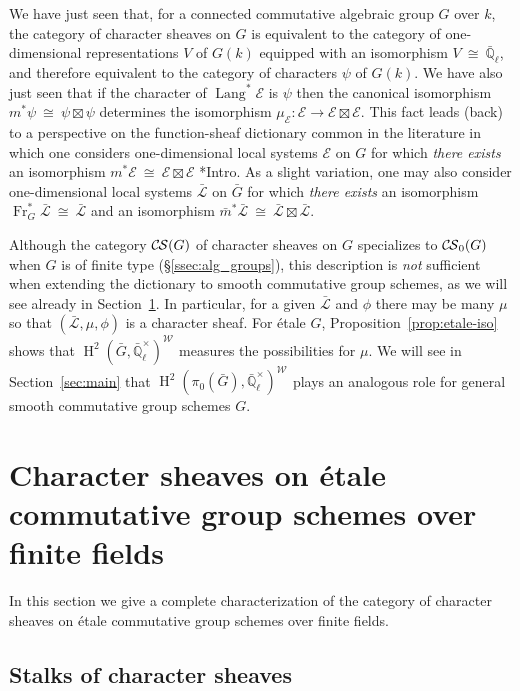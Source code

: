 \documentclass[10pt]{amsart}
\theoremstyle{plain}
\theoremstyle{definition}
\newcommand{\EE}{\mathbb{\bar Q}_\ell}
\newcommand{\Fq}{k}
\newcommand{\EEx}{\EE^\times}
\newcommand{\Weil}[1]{\mathcal{W}_{#1}}
\newcommand{\Frob}[1]{\operatorname{Fr}_{#1}}
\DeclareMathOperator{\Hh}{H}
\DeclareMathOperator{\Lang}{Lang}
\newcommand{\iso}{{\ \cong\ }}
\newcommand{\cs}[1]{{\mathcal{#1}}}
\newcommand{\gcs}[1]{{\mathcal{\bar #1}}}
\newcommand{\CS}{{\mathcal{C\hskip-0.8pt S}}}
\newcommand{\bCS}{{\CS_0}}
\newcommand{\bm}{\bar{m}}
\newcommand{\bG}{\bar{G}}
\begin{document}
We have just seen that, for a connected commutative algebraic group $G$ over $\Fq$, the category of character sheaves
on $G$ is equivalent to the category of one-dimensional representations $V$ of $G(\Fq)$ equipped with an isomorphism
$V\iso \EE$, and therefore equivalent to the category of characters $\psi$ of $G(\Fq)$.
We have also just seen that if the character of $\Lang^*\cs{E}$ is $\psi$ then the canonical isomorphism
$m^*\psi \iso \psi \boxtimes \psi$ determines the isomorphism $\mu_\cs{E} : \cs{E} \to \cs{E}\boxtimes\cs{E}$.
This fact leads (back) to a perspective on the function-sheaf dictionary common in the literature in which one considers
one-dimensional local systems $\cs{E}$ on $G$ for which \emph{there exists} an isomorphism
$m^*\cs{E} \iso \cs{E} \boxtimes\cs{E}$ \cite{kamgarpour:09a}*{Intro}.
As a slight variation, one may also consider one-dimensional local systems $\gcs{L}$ on $\bG$ for which \emph{there exists}
an isomorphism $\Frob{G}^*\gcs{L} \iso \gcs{L}$ and an isomorphism $\bm^*\gcs{L} \iso \gcs{L} \boxtimes\gcs{L}$.

Although the category $\CS(G)$ of character sheaves on $G$ specializes to $\bCS(G)$ when $G$ is of finite type
(\S \ref{ssec:alg_groups}), this description is \emph{not} sufficient when extending the dictionary to smooth
commutative group schemes, as we will see already in Section~\ref{sec:etale}.
In particular, for a given $\gcs{L}$ and $\phi$ there may be many $\mu$ so that $(\gcs{L},\mu,\phi)$ is a character sheaf.
For \'etale $G$, Proposition~\ref{prop:etale-iso} shows that $\Hh^2(\bG,\EEx)^{\Weil{}}$ measures the possibilities for $\mu$.
We will see in Section~\ref{sec:main} that $\Hh^2(\pi_0(\bG),\EEx)^{\Weil{}}$ plays an analogous role for general
smooth commutative group schemes $G$.

\section{Character sheaves on \'etale commutative group schemes over finite fields} \label{sec:etale}

In this section we give a complete characterization of the category of character sheaves on \'etale commutative group schemes over finite fields.

\subsection{Stalks of character sheaves}\label{ssec:stalks}
\end{document}
